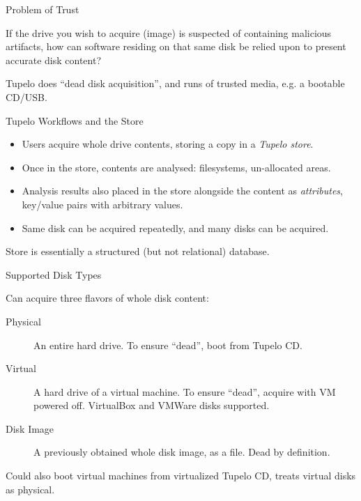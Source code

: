 \documentclass{beamer}
\begin{document}

\begin{frame}{Problem of Trust}

If the drive you wish to acquire (image) is suspected of containing
malicious artifacts, how can software residing on that same disk
be relied upon to present accurate disk content?

Tupelo does ``dead disk acquisition'', and runs of trusted media,
e.g. a bootable CD/USB.

\end{frame}


\begin{frame}{Tupelo Workflows and the Store}

\begin{itemize}
\item
Users acquire whole drive contents, storing a copy in a {\em Tupelo
  store}.

\item
Once in the store, contents are analysed: filesystems, un-allocated
areas.

\item
Analysis results also placed in the store alongside the content as {\em
  attributes}, key/value pairs with arbitrary values.

\item
Same disk can be acquired repeatedly, and many disks can be acquired.

\end{itemize}

Store is essentially a structured (but not relational) database.

\end{frame}


\begin{frame}{Supported Disk Types}

Can acquire three flavors of whole disk content:

\begin{description}
\item[Physical]  An entire hard drive.  To ensure ``dead'', boot from
  Tupelo CD.

\item[Virtual] A hard drive of a virtual machine.  To ensure ``dead'',
  acquire with VM powered off.  VirtualBox and VMWare disks supported.

\item[Disk Image] A previously obtained whole disk image, as a file.
  Dead by definition.
\end{description}

Could also boot virtual machines from virtualized Tupelo CD, treats
virtual disks as physical.

\end{frame}
\end{document}
